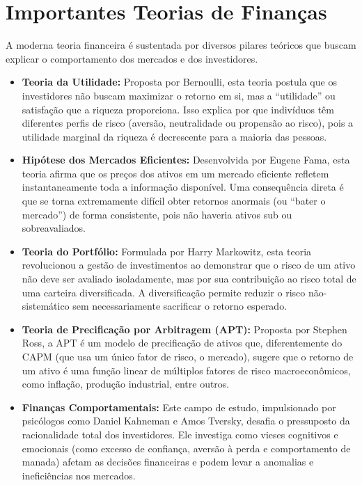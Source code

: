 \documentclass[
  a4paper,
]{book}
\providecommand{\tightlist}{%
  \setlength{\itemsep}{0pt}\setlength{\parskip}{0pt}}\usepackage{longtable,booktabs,array}
\begin{document}
\section{Importantes Teorias de
Finanças}\label{importantes-teorias-de-finanuxe7as}

A moderna teoria financeira é sustentada por diversos pilares teóricos
que buscam explicar o comportamento dos mercados e dos investidores.

\begin{itemize}
\tightlist
\item
  \textbf{Teoria da Utilidade:} Proposta por Bernoulli, esta teoria
  postula que os investidores não buscam maximizar o retorno em si, mas
  a ``utilidade'' ou satisfação que a riqueza proporciona. Isso explica
  por que indivíduos têm diferentes perfis de risco (aversão,
  neutralidade ou propensão ao risco), pois a utilidade marginal da
  riqueza é decrescente para a maioria das pessoas.
\item
  \textbf{Hipótese dos Mercados Eficientes:} Desenvolvida por Eugene
  Fama, esta teoria afirma que os preços dos ativos em um mercado
  eficiente refletem instantaneamente toda a informação disponível. Uma
  consequência direta é que se torna extremamente difícil obter retornos
  anormais (ou ``bater o mercado'') de forma consistente, pois não
  haveria ativos sub ou sobreavaliados.
\item
  \textbf{Teoria do Portfólio:} Formulada por Harry Markowitz, esta
  teoria revolucionou a gestão de investimentos ao demonstrar que o
  risco de um ativo não deve ser avaliado isoladamente, mas por sua
  contribuição ao risco total de uma carteira diversificada. A
  diversificação permite reduzir o risco não-sistemático sem
  necessariamente sacrificar o retorno esperado.
\item
  \textbf{Teoria de Precificação por Arbitragem (APT):} Proposta por
  Stephen Ross, a APT é um modelo de precificação de ativos que,
  diferentemente do CAPM (que usa um único fator de risco, o mercado),
  sugere que o retorno de um ativo é uma função linear de múltiplos
  fatores de risco macroeconômicos, como inflação, produção industrial,
  entre outros.
\item
  \textbf{Finanças Comportamentais:} Este campo de estudo, impulsionado
  por psicólogos como Daniel Kahneman e Amos Tversky, desafia o
  pressuposto da racionalidade total dos investidores. Ele investiga
  como vieses cognitivos e emocionais (como excesso de confiança,
  aversão à perda e comportamento de manada) afetam as decisões
  financeiras e podem levar a anomalias e ineficiências nos mercados.
\end{itemize}
\end{document}
